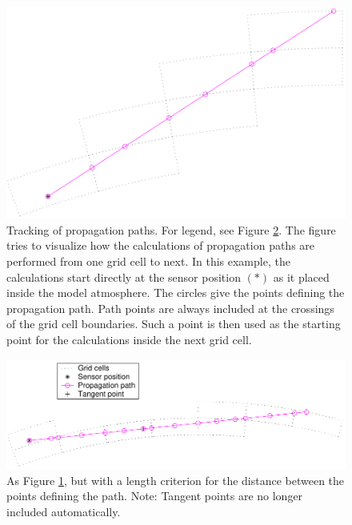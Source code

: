 \begin{figure}
 \begin{center}
  \includegraphics*[width=0.80\hsize]{ppath_ex1}
  \caption{Tracking of propagation paths. For legend, see 
    Figure \ref{fig:ppath:ex2}. The figure tries to visualize how the
    calculations of propagation paths are performed from one grid cell
    to next. In this example, the calculations start directly at the
    sensor position $(\ast)$ as it placed inside the model
    atmosphere. The circles give the points defining the propagation
    path. Path points are always included at the crossings of the grid
    cell boundaries. Such a point is then used as the starting point
    for the calculations inside the next grid cell. }
  \label{fig:ppath:ex1}  
 \end{center}
\end{figure}

\begin{figure}
 \begin{center}
   \includegraphics*[width=0.98\hsize]{ppath_ex2}
  \caption{As Figure \ref{fig:ppath:ex1}, but with a length criterion 
    for the distance between the points defining the path.
    Note: Tangent points are no longer included automatically.}
  \label{fig:ppath:ex2}  
 \end{center}
\end{figure}


